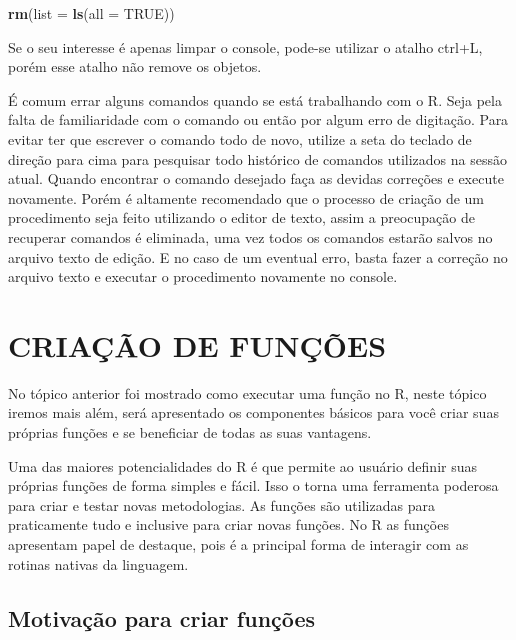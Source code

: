 \documentclass[
  11pt,
  a5paper,
  openany]{book}
\newenvironment{Shaded}{\begin{snugshade}}{\end{snugshade}}
\newcommand{\DataTypeTok}[1]{\textcolor[rgb]{0.13,0.29,0.53}{#1}}
\newcommand{\KeywordTok}[1]{\textcolor[rgb]{0.13,0.29,0.53}{\textbf{#1}}}
\newcommand{\NormalTok}[1]{#1}
\newcommand{\OtherTok}[1]{\textcolor[rgb]{0.56,0.35,0.01}{#1}}
\begin{document}
\begin{Shaded}
\begin{Highlighting}[]
\KeywordTok{rm}\NormalTok{(}\DataTypeTok{list =} \KeywordTok{ls}\NormalTok{(}\DataTypeTok{all =} \OtherTok{TRUE}\NormalTok{))}
\end{Highlighting}
\end{Shaded}

Se o seu interesse é apenas limpar o console, pode-se utilizar o atalho ctrl+L, porém esse atalho não remove os objetos.

É comum errar alguns comandos quando se está trabalhando com o R. Seja pela falta de familiaridade com o comando ou então por algum erro de digitação. Para evitar ter que escrever o comando todo de novo, utilize a seta do teclado de direção para cima para pesquisar todo histórico de comandos utilizados na sessão atual. Quando encontrar o comando desejado faça as devidas correções e execute novamente. Porém é altamente recomendado que o processo de criação de um procedimento seja feito utilizando o editor de texto, assim a preocupação de recuperar comandos é eliminada, uma vez todos os comandos estarão salvos no arquivo texto de edição. E no caso de um eventual erro, basta fazer a correção no arquivo texto e executar o procedimento novamente no console.

\hypertarget{criauxe7uxe3o-de-funuxe7uxf5es}{%
\chapter{CRIAÇÃO DE FUNÇÕES}\label{criauxe7uxe3o-de-funuxe7uxf5es}}

No tópico anterior foi mostrado como executar uma função no R, neste tópico iremos mais além, será apresentado os componentes básicos para você criar suas próprias funções e se beneficiar de todas as suas vantagens.

Uma das maiores potencialidades do R é que permite ao usuário definir suas próprias funções de forma simples e fácil. Isso o torna uma ferramenta poderosa para criar e testar novas metodologias. As funções são utilizadas para praticamente tudo e inclusive para criar novas funções. No R as funções apresentam papel de destaque, pois é a principal forma de interagir com as rotinas nativas da linguagem.

\hypertarget{motivauxe7uxe3o-para-criar-funuxe7uxf5es}{%
\section{Motivação para criar funções}\label{motivauxe7uxe3o-para-criar-funuxe7uxf5es}}
\end{document}

